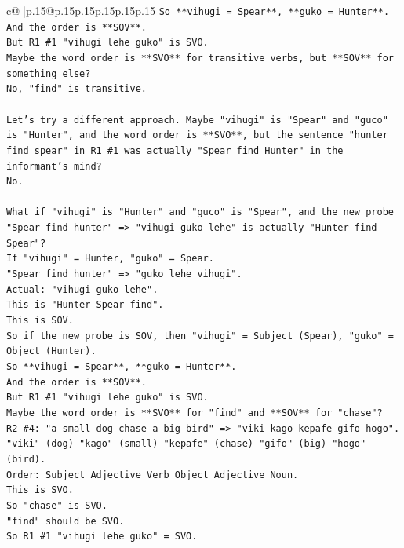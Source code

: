 \documentclass{article}
\begin{document}
{\begin{supertabular}{c@{$\;$}|p{.15\linewidth}@{}p{.15\linewidth}p{.15\linewidth}p{.15\linewidth}p{.15\linewidth}p{.15\linewidth}}
{{{\texttt{So **vihugi = Spear**, **guko = Hunter**.} \\
\texttt{And the order is **SOV**.} \\
\texttt{But R1 \#1 "vihugi lehe guko" is SVO.} \\
\texttt{Maybe the word order is **SVO** for transitive verbs, but **SOV** for something else?} \\
\texttt{No, "find" is transitive.} \\
\\ 
\texttt{Let's try a different approach. Maybe "vihugi" is "Spear" and "guco" is "Hunter", and the word order is **SVO**, but the sentence "hunter find spear" in R1 \#1 was actually "Spear find Hunter" in the informant's mind?} \\
\texttt{No.} \\
\\ 
\texttt{What if "vihugi" is "Hunter" and "guco" is "Spear", and the new probe "Spear find hunter" => "vihugi guko lehe" is actually "Hunter find Spear"?} \\
\texttt{If "vihugi" = Hunter, "guko" = Spear.} \\
\texttt{"Spear find hunter" => "guko lehe vihugi".} \\
\texttt{Actual: "vihugi guko lehe".} \\
\texttt{This is "Hunter Spear find".} \\
\texttt{This is SOV.} \\
\texttt{So if the new probe is SOV, then "vihugi" = Subject (Spear), "guko" = Object (Hunter).} \\
\texttt{So **vihugi = Spear**, **guko = Hunter**.} \\
\texttt{And the order is **SOV**.} \\
\texttt{But R1 \#1 "vihugi lehe guko" is SVO.} \\
\texttt{Maybe the word order is **SVO** for "find" and **SOV** for "chase"?} \\
\texttt{R2 \#4: "a small dog chase a big bird" => "viki kago kepafe gifo hogo".} \\
\texttt{"viki" (dog) "kago" (small) "kepafe" (chase) "gifo" (big) "hogo" (bird).} \\
\texttt{Order: Subject Adjective Verb Object Adjective Noun.} \\
\texttt{This is SVO.} \\
\texttt{So "chase" is SVO.} \\
\texttt{"find" should be SVO.} \\
\texttt{So R1 \#1 "vihugi lehe guko" = SVO.} \\
}}}
\end{supertabular}}
\end{document}
